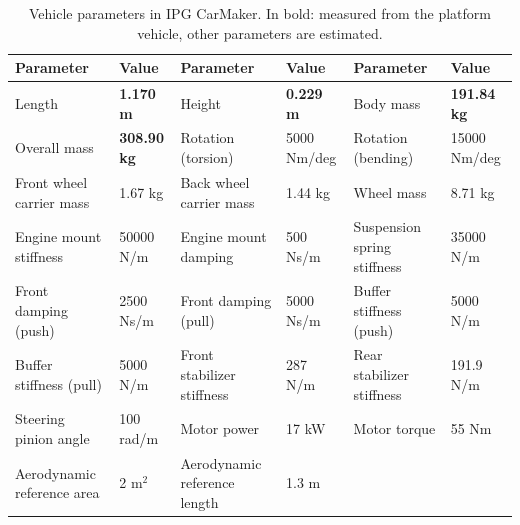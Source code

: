 \documentclass[a4paper, 10pt, conference]{ieeeconf}      %
\begin{document}
\begin{table}
  \caption{Vehicle parameters in IPG CarMaker. In bold: measured from the
    platform vehicle, other parameters are estimated.}
  \centering
  \begin{tabular}{llllll}
    \toprule
    Parameter & Value & Parameter & Value & Parameter & Value\\
    \midrule
    Length & \textbf{1.170 m} & Height & \textbf{0.229 m} & Body mass &
                                                                        \textbf{191.84 kg}\\
    Overall mass & \textbf{308.90 kg} & Rotation (torsion) & 5000 Nm/deg & Rotation (bending) & 15000 Nm/deg\\
    Front wheel carrier mass & 1.67 kg & Back wheel carrier mass & 1.44 kg &
                                                                           Wheel
                                                                           mass
                                                      & 8.71 kg\\
    Engine mount stiffness & 50000 N/m & Engine mount damping & 500 Ns/m &
                                                                           Suspension
                                                                           spring
                                                                           stiffness
                                                      & 35000 N/m\\
    Front damping (push) & 2500 Ns/m & Front damping (pull) & 5000 Ns/m & Buffer
                                                                        stiffness
                                                                        (push)
                                                      & 5000 N/m\\
    Buffer stiffness (pull) & 5000 N/m & Front stabilizer stiffness & 287 N/m &
                                                                              Rear
                                                                                stabilizer
                                                                                stiffness
                                                      & 191.9 N/m\\




                      Steering pinion angle & 100 rad/m & Motor power & 17 kW &
                                                                               Motor torque & 55 Nm\\
    Aerodynamic reference area & 2 m$^2$ & Aerodynamic reference length & 1.3 m
                                          & &\\
        \bottomrule
  \end{tabular}
  \label{tab:ipg}
\end{table}
\end{document}

